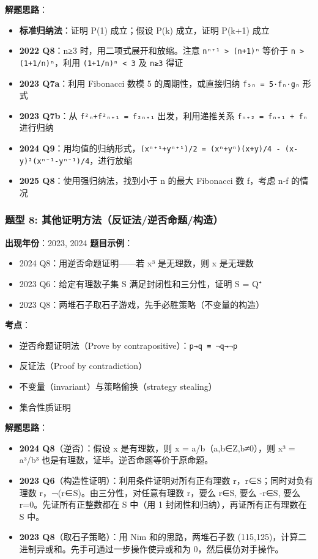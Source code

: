 \documentclass[10pt,a4paper,openany]{ctexbook}
\theoremstyle{definition}
\theoremstyle{remark}
\begin{document}
\textbf{解题思路}：
\begin{itemize}
\item \textbf{标准归纳法}：证明 P(1) 成立；假设 P(k) 成立，证明 P(k+1) 成立
\item \textbf{2022 Q8}：n≥3 时，用二项式展开和放缩。注意 \texttt{nⁿ⁺¹ > (n+1)ⁿ} 等价于 \texttt{n > (1+1/n)ⁿ}，利用 \texttt{(1+1/n)ⁿ < 3} 及 \texttt{n≥3} 得证
\item \textbf{2023 Q7a}：利用 Fibonacci 数模 5 的周期性，或直接归纳 \texttt{f₅ₙ = 5·fₙ·gₙ} 形式
\item \textbf{2023 Q7b}：从 \texttt{f²ₙ+f²ₙ₊₁ = f₂ₙ₊₁} 出发，利用递推关系 \texttt{fₙ₊₂ = fₙ₊₁ + fₙ} 进行归纳
\item \textbf{2024 Q9}：用均值的归纳形式，\texttt{(xⁿ⁺¹+yⁿ⁺¹)/2 = (xⁿ+yⁿ)(x+y)/4 - (x-y)²(xⁿ⁻¹-yⁿ⁻¹)/4}，进行放缩
\item \textbf{2025 Q8}：使用强归纳法，找到小于 n 的最大 Fibonacci 数 f，考虑 n-f 的情况

\end{itemize}

\vspace{-2pt}

\subsubsection{题型 8: 其他证明方法（反证法/逆否命题/构造）}

\textbf{出现年份}：2023, 2024
\textbf{题目示例}：
\begin{itemize}
\item 2024 Q8：用逆否命题证明——若 x³ 是无理数，则 x 是无理数
\item 2023 Q6：给定有理数子集 S 满足封闭性和三分性，证明 S = Q⁺
\item 2023 Q8：两堆石子取石子游戏，先手必胜策略（不变量的构造）

\end{itemize}

\textbf{考点}：
\begin{itemize}
\item 逆否命题证明法（Prove by contrapositive）：\texttt{p→q ≡ ¬q→¬p}
\item 反证法（Proof by contradiction）
\item 不变量（invariant）与策略偷换（strategy stealing）
\item 集合性质证明

\end{itemize}

\textbf{解题思路}：
\begin{itemize}
\item \textbf{2024 Q8}（逆否）：假设 x 是有理数，则 x = a/b（a,b∈Z,b≠0），则 x³ = a³/b³ 也是有理数，证毕。逆否命题等价于原命题。
\item \textbf{2023 Q6}（构造性证明）：利用条件证明对所有正有理数 r，r∈S；同时对负有理数 r，¬(r∈S)。由三分性，对任意有理数 r，要么 r∈S, 要么 -r∈S, 要么 r=0。先证所有正整数都在 S 中（用 1 封闭性和归纳），再证所有正有理数在 S 中。
\item \textbf{2023 Q8}（取石子策略）：用 Nim 和的思路，两堆石子数 (115,125)，计算二进制异或和。先手可通过一步操作使异或和为 0，然后模仿对手操作。

\end{itemize}
\end{document}

